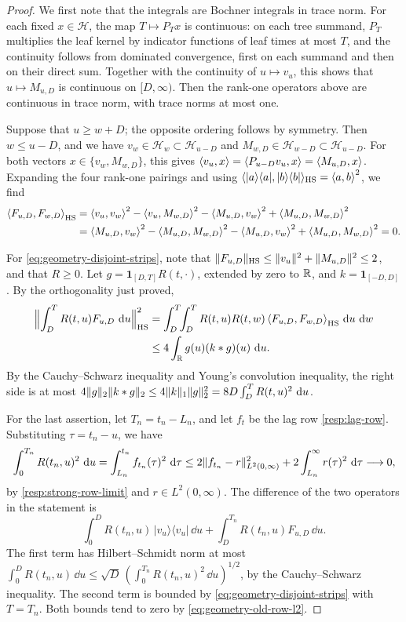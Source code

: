 \begin{proof}
We first note that the integrals are Bochner integrals in trace norm. For each fixed $x\in\mathcal H$, the map $T\mapsto P_Tx$ is continuous: on each tree summand, $P_T$ multiplies the leaf kernel by indicator functions of leaf times at most $T$, and the continuity follows from dominated convergence, first on each summand and then on their direct sum. Together with the continuity of $u\mapsto v_u$, this shows that $u\mapsto M_{u,D}$ is continuous on $[D,\infty)$. Then the rank-one operators above are continuous in trace norm, with trace norms at most one.

Suppose that $u\ge w+D$; the opposite ordering follows by symmetry. Then $w\le u-D$, and we have $v_w\in\mathcal H_w\subset\mathcal H_{u-D}$ and $M_{w,D}\in\mathcal H_{w-D}\subset\mathcal H_{u-D}$. For both vectors $x\in\{v_w,M_{w,D}\}$, this gives $\left\langle v_u,x\right\rangle=\left\langle P_{u-D}v_u,x\right\rangle=\left\langle M_{u,D},x\right\rangle$. Expanding the four rank-one pairings and using $\langle|a\rangle\langle a|,|b\rangle\langle b|\rangle_{\mathrm{HS}}=\left\langle a,b\right\rangle^2$, we find
\begin{align*}
 \left\langle F_{u,D},F_{w,D}\right\rangle_{\mathrm{HS}}
 &=\left\langle v_u,v_w\right\rangle^2-\left\langle v_u,M_{w,D}\right\rangle^2-\left\langle M_{u,D},v_w\right\rangle^2+\left\langle M_{u,D},M_{w,D}\right\rangle^2\\
 &=\left\langle M_{u,D},v_w\right\rangle^2-\left\langle M_{u,D},M_{w,D}\right\rangle^2-\left\langle M_{u,D},v_w\right\rangle^2+\left\langle M_{u,D},M_{w,D}\right\rangle^2=0 .
\end{align*}

For \eqref{eq:geometry-disjoint-strips}, note that $\lVert F_{u,D}\rVert_{\mathrm{HS}}\le\lVert v_u\rVert^2+\lVert M_{u,D}\rVert^2\le2$, and that $R\ge0$. Let $g=\mathbf1_{[D,T]}R(t,\cdot)$, extended by zero to $\mathbb R$, and $k=\mathbf1_{[-D,D]}$. By the orthogonality just proved,
\begin{align*}
 \Bigl\|\int_D^TR(t,u)F_{u,D}\,\mathop{}\!\mathrm d u\Bigr\|_{\mathrm{HS}}^2
 &=\int_D^T\!\!\int_D^TR(t,u)R(t,w)\left\langle F_{u,D},F_{w,D}\right\rangle_{\mathrm{HS}}\,\mathop{}\!\mathrm d u\,\mathop{}\!\mathrm d w\\
 &\le4\int_\mathbb R g(u)(k*g)(u)\,\mathop{}\!\mathrm d u .
\end{align*}
By the Cauchy--Schwarz inequality and Young's convolution inequality, the right side is at most $4\lVert g\rVert_2\lVert k*g\rVert_2\le4\lVert k\rVert_1\lVert g\rVert_2^2=8D\int_D^TR(t,u)^2\,\mathop{}\!\mathrm d u$.

For the last assertion, let $T_n=t_n-L_n$, and let $f_t$ be the lag row \eqref{resp:lag-row}. Substituting $\tau=t_n-u$, we have
\begin{equation}\label{eq:geometry-old-row-l2}
 \int_0^{T_n}R(t_n,u)^2\,\mathop{}\!\mathrm d u=\int_{L_n}^{t_n}f_{t_n}(\tau)^2\,\mathop{}\!\mathrm d\tau
 \le2\lVert f_{t_n}-r\rVert_{L^2(0,\infty)}^2+2\int_{L_n}^\infty r(\tau)^2\,\mathop{}\!\mathrm d\tau\longrightarrow0,
\end{equation}
by \eqref{resp:strong-row-limit} and $r\in L^2(0,\infty)$. The difference of the two operators in the statement is
\[
 \int_0^DR(t_n,u)\,|v_u\rangle\langle v_u|\,\dd u+\int_D^{T_n}R(t_n,u)F_{u,D}\,\dd u .
\]
The first term has Hilbert--Schmidt norm at most $\int_0^DR(t_n,u)\,\dd u\le\sqrt D\,(\int_0^{T_n}R(t_n,u)^2\,\dd u)^{1/2}$, by the Cauchy--Schwarz inequality. The second term is bounded by \eqref{eq:geometry-disjoint-strips} with $T=T_n$. Both bounds tend to zero by \eqref{eq:geometry-old-row-l2}.
\end{proof}

